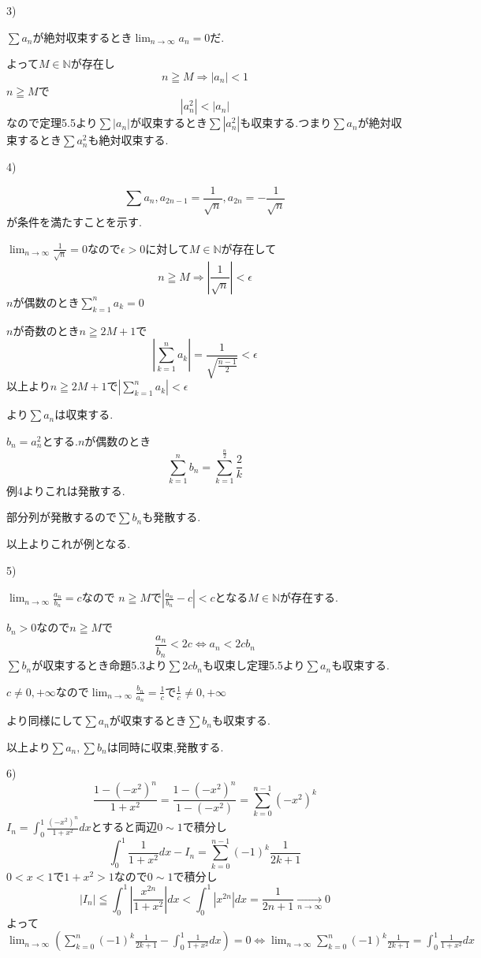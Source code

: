 \documentclass{jsarticle}
\begin{document}
3)

$\sum a_n$が絶対収束するとき$\displaystyle \lim_{n\to\infty}a_n = 0$だ.

よって$M\in\mathbb{N}$が存在し
\[n\geqq M \Rightarrow |a_n| < 1\]
$n\geqq M$で
\[|a_n^2|<|a_n|\]
なので定理5.5より$\sum |a_n|$が収束するとき$\sum |a_n^2|$も収束する.つまり$\sum a_n$が絶対収束するとき$\sum a_n^2$も絶対収束する.

4)

\[\sum a_n, a_{2n-1}=\frac{1}{\sqrt{n}}, a_{2n}=-\frac{1}{\sqrt{n}}\]
が条件を満たすことを示す.

$\displaystyle \lim_{n\to\infty}\frac{1}{\sqrt{n}}=0$なので$\epsilon > 0$に対して$M\in \mathbb{N}$が存在して
\[n\geqq M\Rightarrow |\frac{1}{\sqrt{n}}| < \epsilon\]
$n$が偶数のとき$\displaystyle \sum_{k=1}^n a_k = 0$

$n$が奇数のとき$n \geqq 2M+1$で
\[|\sum_{k=1}^n a_k| = \frac{1}{\sqrt{\frac{n-1}{2}}} < \epsilon\]
以上より$n\geqq 2M+1$で$\displaystyle |\sum_{k=1}^n a_k| < \epsilon$

より$\sum a_n$は収束する.

$b_n = a_n^2$とする.$n$が偶数のとき
\[\sum_{k=1}^n b_n = \sum_{k=1}^\frac{n}{2} \frac{2}{k}\]
例4よりこれは発散する.

部分列が発散するので$\sum b_n$も発散する.

以上よりこれが例となる.

5)

$\displaystyle\lim_{n\to\infty} \frac{a_n}{b_n}=c$なので
$n\geqq M$で$|\frac{a_n}{b_n}-c|< c$となる$M\in\mathbb{N}$が存在する.

$b_n >0$なので$n\geqq M$で
\[\frac{a_n}{b_n}<2c \Leftrightarrow a_n < 2cb_n\]
$\sum b_n$が収束するとき命題5.3より$\sum 2cb_n$も収束し定理5.5より$\sum a_n$も収束する.

$c\neq 0,+\infty$なので$\displaystyle\lim_{n\to\infty}
\frac{b_n}{a_n}=\frac{1}{c}$で$\frac{1}{c}\neq 0,+\infty$

より同様にして$\sum a_n$が収束するとき$\sum b_n$も収束する.

以上より$\sum a_n,\sum b_n$は同時に収束,発散する.

6)
\[\frac{1-(-x^2)^n}{1+x^2}=\frac{1-(-x^2)^n}{1-(-x^2)} =\sum_{k=0}^{n-1} (-x^2)^k\]
$I_n=\int_0^1\frac{(-x^2)^n}{1+x^2}dx$とすると両辺$0\sim 1$で積分し
\[\int_0^1\frac{1}{1+x^2}dx-I_n=\sum_{k=0}^{n-1} (-1)^k\frac{1}{2k+1}\]
$0<x<1$で$1+x^2>1$なので$0\sim 1$で積分し
\[|I_n| \leqq \int_0^1|\frac{x^{2n}}{1+x^2}|dx<\int_0^1|x^{2n}|dx=\frac{1}{2n+1}\xrightarrow[n\to\infty]{}0\]
よって$\displaystyle \lim_{n\to\infty}(\sum_{k=0}^n (-1)^k\frac{1}{2k+1}-\int_0^1\frac{1}{1+x^2}dx)=0\Leftrightarrow \lim_{n\to\infty}\sum_{k=0}^n (-1)^k\frac{1}{2k+1}=\int_0^1\frac{1}{1+x^2}dx$
\end{document}
